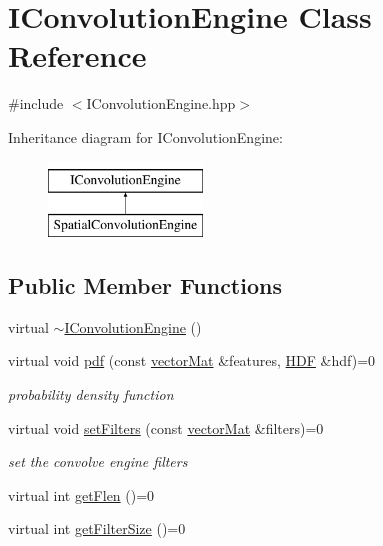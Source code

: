 \hypertarget{classIConvolutionEngine}{\section{I\-Convolution\-Engine Class Reference}
\label{classIConvolutionEngine}
}


{\ttfamily \#include $<$I\-Convolution\-Engine.\-hpp$>$}

Inheritance diagram for I\-Convolution\-Engine\-:\begin{figure}[H]
\begin{center}
\leavevmode
\includegraphics[height=2.000000cm]{classIConvolutionEngine}
\end{center}
\end{figure}
\subsection*{Public Member Functions}
\begin{DoxyCompactItemize}
\item 
virtual \hyperlink{classIConvolutionEngine_a554cb87e8dbd32552defd43549b9c1b3}{$\sim$\-I\-Convolution\-Engine} ()
\item 
virtual void \hyperlink{classIConvolutionEngine_a000909b784828ec3f94397300ca67803}{pdf} (const \hyperlink{types_8hpp_a3207a7addcfa415d1c83622febcb1e9b}{vector\-Mat} \&features, \hyperlink{classHDF}{H\-D\-F} \&hdf)=0
\begin{DoxyCompactList}\small\item\em probability density function \end{DoxyCompactList}\item 
virtual void \hyperlink{classIConvolutionEngine_a3570aae351b5fcb93bcd87a06c65ea0a}{set\-Filters} (const \hyperlink{types_8hpp_a3207a7addcfa415d1c83622febcb1e9b}{vector\-Mat} \&filters)=0
\begin{DoxyCompactList}\small\item\em set the convolve engine filters \end{DoxyCompactList}\item 
virtual int \hyperlink{classIConvolutionEngine_aba18cf7c79b1d0aa59184321b3c44f45}{get\-Flen} ()=0
\item 
virtual int \hyperlink{classIConvolutionEngine_a97fa06032937448efc6b50d4210b758b}{get\-Filter\-Size} ()=0
\end{DoxyCompactItemize}


